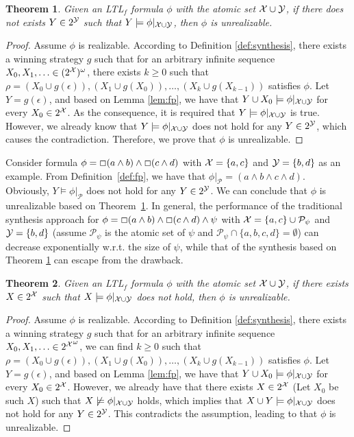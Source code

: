 \documentclass[letterpaper]{article} %
\newcommand{\ltlf}{\textsf{LTL}$_f$\xspace}
\newtheorem{theorem}{Theorem}
\begin{document}
\begin{theorem}\label{thm:failure-1}
Given an \ltlf formula $\phi$ with the atomic set $\mathcal{X}\cup \mathcal{Y}$, if there does not exists $Y\in 2^{\mathcal{Y}}$ such that $Y\models \phi|_{\mathcal{X}\cup\mathcal{Y}}$, then $\phi$ is unrealizable. 
\end{theorem}
\begin{proof}
Assume $\phi$ is realizable. According to Definition \ref{def:synthesis}, there exists a winning strategy $g$ such that for an arbitrary infinite sequence $X_0,X_1,\ldots\in (2^{\mathcal{X}})^{\omega}$, there exists $k\geq 0$ such that $\rho=(X_0\cup g(\epsilon)),(X_1\cup g(X_0)), \ldots, (X_k\cup g(X_{k-1}))$ satisfies $\phi$. Let $Y = g(\epsilon)$, and based on Lemma \ref{lem:fp}, we have that $Y\cup X_0\models \phi|_{\mathcal{X}\cup\mathcal{Y}}$ for every $X_0\in 2^{\mathcal{X}}$. As the consequence, it is required that $Y\models \phi|_{\mathcal{X}\cup\mathcal{Y}}$ is true. However, we already know that $Y\models \phi|_{\mathcal{X}\cup\mathcal{Y}}$ does not hold for any $Y\in 2^{\mathcal{Y}}$, which causes the contradiction. Therefore, we prove that $\phi$ is unrealizable.
\end{proof}

Consider formula $\phi= \Box (a\wedge b)\wedge \Box (c\wedge d)$ with $\mathcal{X}=\{a,c\}$ and $\mathcal{Y}=\{b,d\}$ as an example. From Definition~\ref{def:fp}, we have that $\phi|_\mathcal{P}=(a\wedge b\wedge c\wedge d)$. Obviously, $Y\models \phi|_\mathcal{P}$ does not hold for any $Y\in 2^{\mathcal{Y}}$. We can conclude that $\phi$ is unrealizable based on Theorem~\ref{thm:failure-1}. In general, the performance of the traditional synthesis approach for $\phi= \Box (a\wedge b)\wedge \Box (c\wedge d) \wedge\psi$ with $\mathcal{X}=\{a,c\}\cup \mathcal{P}_{\psi}$ and $\mathcal{Y}=\{b,d\}$ (assume $\mathcal{P}_{\psi}$ is the atomic set of $\psi$ and $\mathcal{P}_{\psi} \cap \{a,b,c,d\} = \emptyset$) can decrease exponentially w.r.t. the size of $\psi$, while that of the synthesis based on Theorem \ref{thm:failure-1} can escape from the drawback. 

\iffalse
\begin{theorem}\label{thm:failure-2}
	Given an \ltlf formula $\phi$ with the atomic set $\mathcal{X}\cup \mathcal{Y}$, if there exists $X\in 2^{\mathcal{X}}$ such that $X\models \phi|_{\mathcal{X}\cup\mathcal{Y}}$ does not hold, then $\phi$ is unrealizable. 
\end{theorem}
\begin{proof}
Assume $\phi$ is realizable. According to Definition \ref{def:synthesis}, there exists a winning strategy $g$ such that for an arbitrary infinite sequence $X_0,X_1,\ldots\in {2^{\mathcal{X}}}^{\omega}$, we can find $k\geq 0$ such that $\rho=(X_0\cup g(\epsilon)),(X_1\cup g(X_0)), \ldots, (X_k\cup g(X_{k-1}))$ satisfies $\phi$. Let $Y = g(\epsilon)$, and based on Lemma \ref{lem:fp}, we have that $Y\cup X_0\models \phi|_{\mathcal{X}\cup\mathcal{Y}}$ for every $X_0\in 2^{\mathcal{X}}$. However, we already have that there exists $X\in 2^{\mathcal{X}}$ (Let $X_0$ be such $X$) such that $X\not\models \phi|_{\mathcal{X}\cup\mathcal{Y}}$ holds, which implies that $X\cup Y\models \phi|_{\mathcal{X}\cup\mathcal{Y}}$ does not hold for any $Y\in 2^{\mathcal{Y}}$. This contradicts the assumption, leading to that $\phi$ is unrealizable.
\end{proof}
\end{document}
